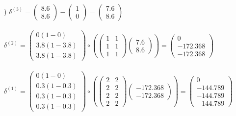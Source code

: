 \documentclass[12pt]{article}
\begin{document}
\noindent \hrulefill \\



) $\delta^{(3)} = 
\begin{pmatrix}
8.6 \\ 8.6
\end{pmatrix} - 
\begin{pmatrix}
1 \\ 0
\end{pmatrix} = 
\begin{pmatrix}
7.6 \\ 8.6
\end{pmatrix}$\\\\

\indent $\delta^{(2)} = 
\begin{pmatrix}
0(1 - 0) \\ 3.8(1 - 3.8) \\ 3.8(1 - 3.8)
\end{pmatrix} \circ \left(
\begin{pmatrix}
1 & 1 \\
1 & 1 \\
1 & 1 
\end{pmatrix}
\begin{pmatrix}
7.6 \\ 8.6
\end{pmatrix} \right) = 
\begin{pmatrix}
0 \\ -172.368 \\ -172.368
\end{pmatrix}
$\\\\

\indent $\delta^{(1)} = 
\begin{pmatrix}
0(1 - 0) \\ 0.3(1 - 0.3) \\ 0.3(1 - 0.3) \\ 0.3(1 - 0.3)
\end{pmatrix} \circ \left(
\begin{pmatrix}
2 & 2 \\
2 & 2 \\
2 & 2 \\
2 & 2 
\end{pmatrix}
\begin{pmatrix}
-172.368 \\ -172.368
\end{pmatrix}\right) = 
\begin{pmatrix}
0 \\ -144.789 \\ -144.789 \\ -144.789
\end{pmatrix}
$\\
\end{document}
